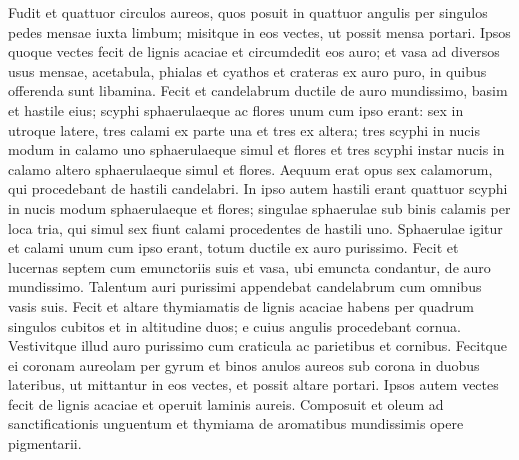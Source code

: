 \begin{biblechapter}
\begin{biblechapter}
\begin{biblechapter}
\begin{biblechapter}
\begin{biblechapter}
\begin{biblechapter}
\begin{biblechapter}
\begin{biblechapter}
\begin{biblechapter}
\begin{biblechapter}
\begin{biblechapter}
\begin{biblechapter}
\begin{biblechapter}
\begin{biblechapter}
\begin{biblechapter}
\begin{biblechapter}
\begin{biblechapter}
\begin{biblechapter}
\begin{biblechapter}
\begin{biblechapter}
\begin{biblechapter}
\begin{biblechapter}
\begin{biblechapter}
\begin{biblechapter}
\begin{biblechapter}
\begin{biblechapter}
\begin{biblechapter}
\begin{biblechapter}
\begin{biblechapter}
\begin{biblechapter}
\begin{biblechapter}
\begin{biblechapter}
\begin{biblechapter}
\begin{biblechapter}
\begin{biblechapter}
\begin{biblechapter}
\begin{biblechapter}
\verse Fudit et quattuor circulos aureos, quos posuit in quattuor angulis per singulos pedes mensae 
\verse iuxta limbum; misitque in eos vectes, ut possit mensa portari. 
\verse Ipsos quoque vectes fecit de lignis acaciae et circumdedit eos auro; 
\verse et vasa ad diversos usus mensae, acetabula, phialas et cyathos et crateras ex auro puro, in quibus offerenda sunt libamina.
 \verse Fecit et candelabrum ductile de auro mundissimo, basim et hastile eius; scyphi sphaerulaeque ac flores unum cum ipso erant: 
\verse sex in utroque latere, tres calami ex parte una et tres ex altera; 
\verse tres scyphi in nucis modum in calamo uno sphaerulaeque simul et flores et tres scyphi instar nucis in calamo altero sphaerulaeque simul et flores. Aequum erat opus sex calamorum, qui procedebant de hastili candelabri. 
\verse In ipso autem hastili erant quattuor scyphi in nucis modum sphaerulaeque et flores; 
\verse singulae sphaerulae sub binis calamis per loca tria, qui simul sex fiunt calami procedentes de hastili uno. 
\verse Sphaerulae igitur et calami unum cum ipso erant, totum ductile ex auro purissimo. 
\verse Fecit et lucernas septem cum emunctoriis suis et vasa, ubi emuncta condantur, de auro mundissimo. 
\verse Talentum auri purissimi appendebat candelabrum cum omnibus vasis suis.
 \verse Fecit et altare thymiamatis de lignis acaciae habens per quadrum singulos cubitos et in altitudine duos; e cuius angulis procedebant cornua. 
\verse Vestivitque illud auro purissimo cum craticula ac parietibus et cornibus. 
\verse Fecitque ei coronam aureolam per gyrum et binos anulos aureos sub corona in duobus lateribus, ut mittantur in eos vectes, et possit altare portari. 
\verse Ipsos autem vectes fecit de lignis acaciae et operuit laminis aureis.
 \verse Composuit et oleum ad sanctificationis unguentum et thymiama de aromatibus mundissimis opere pigmentarii.
 

\end{biblechapter}
\end{biblechapter}
\end{biblechapter}
\end{biblechapter}
\end{biblechapter}
\end{biblechapter}
\end{biblechapter}
\end{biblechapter}
\end{biblechapter}
\end{biblechapter}
\end{biblechapter}
\end{biblechapter}
\end{biblechapter}
\end{biblechapter}
\end{biblechapter}
\end{biblechapter}
\end{biblechapter}
\end{biblechapter}
\end{biblechapter}
\end{biblechapter}
\end{biblechapter}
\end{biblechapter}
\end{biblechapter}
\end{biblechapter}
\end{biblechapter}
\end{biblechapter}
\end{biblechapter}
\end{biblechapter}
\end{biblechapter}
\end{biblechapter}
\end{biblechapter}
\end{biblechapter}
\end{biblechapter}
\end{biblechapter}
\end{biblechapter}
\end{biblechapter}
\end{biblechapter}
